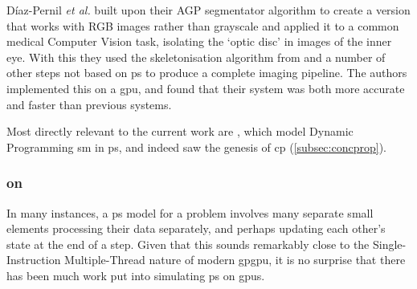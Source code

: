 Díaz-Pernil \textit{et al.} \cite{Diaz-Pernil2016} built upon their AGP segmentator algorithm to create a version that works with RGB images rather than grayscale and applied it to a common medical Computer Vision task, isolating the `optic disc' in images of the inner eye.  With this they used the skeletonisation algorithm from \cite{Diaz-Pernil2013a} and a number of other steps not based on \gls{ps} to produce a complete imaging pipeline.  The authors implemented this on a \gls{gpu}, and found that their system was both more accurate and faster than previous systems.

Most directly relevant to the current work are \cite{GimelFarb2013a,Gimelfarb2011,Nicolescu2014b}, which model Dynamic Programming \gls{sm} in \gls{ps}, and indeed saw the genesis of \gls{cp} (\autoref{subsec:concprop}).  

\subsubsection{ on }
In many instances, a \gls{ps} model for a problem involves many separate small elements processing their data separately, and perhaps updating each other's state at the end of a step.  Given that this sounds remarkably close to the Single-Instruction Multiple-Thread \cite[Ch. 4.4.1]{Hennessy2012} nature of modern \gls{gpgpu}, it is no surprise that there has been much work put into simulating \gls{ps} on \glspl{gpu}.

\cite{Cecilia2010,Cecilia2010a,Cecilia2013,Macias-Ramos2015,Martinez-Del-Amor2015,Martinez-Del-Amor2013a,Maroosi2014,Maroosi2014a}

